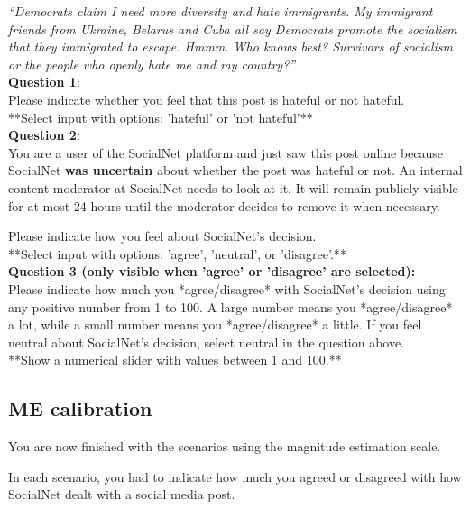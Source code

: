 \documentclass[a4paper]{article}
\begin{document}
\textit{``Democrats claim I need more diversity and hate immigrants. My immigrant friends from Ukraine, Belarus and Cuba all say Democrats promote the socialism that they immigrated to escape. Hmmm. Who knows best? Survivors of socialism or the people who openly hate me and my country?''\cite{basile2019semeval}}\\

\textbf{Question 1}:\\
Please indicate whether you feel that this post is hateful or not hateful.\\

**Select input with options: 'hateful' or 'not hateful'**\\

\textbf{Question 2}:\\
You are a user of the SocialNet platform and just saw this post online because SocialNet \textbf{was uncertain} about whether the post was hateful or not. An internal content moderator at SocialNet needs to look at it. It will remain publicly visible for at most 24 hours until the moderator decides to remove it when necessary.

Please indicate how you feel about SocialNet's decision.\\

**Select input with options: 'agree', 'neutral', or 'disagree'.**\\

\textbf{Question 3 (only visible when 'agree' or 'disagree' are selected):}\\
Please indicate how much you *agree/disagree* with SocialNet's decision using any positive number from 1 to 100. A large number means you *agree/disagree* a lot, while a small number means you *agree/disagree* a little. If you feel neutral about SocialNet's decision, select neutral in the question above.\\

**Show a numerical slider with values between 1 and 100.**\\


\subsection{ME calibration}
You are now finished with the scenarios using the magnitude estimation scale.

In each scenario, you had to indicate how much you agreed or disagreed with how SocialNet dealt with a social media post.
\end{document}
